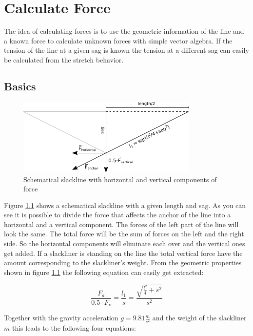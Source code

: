 \chapter{Calculate Force}

The idea of calculating forces is to use the geometric information of the line and a known force to calculate unknown forces with simple vector algebra. If the tension of the line at a given sag is known the tension at a different sag can easily be calculated from the stretch behavior.

\section{Basics} \label{sec:basics}

\begin{figure}[htb] \centering
	\includegraphics[width=0.8\textwidth]{images/slacklineWithForces.pdf}
	\caption{Schematical slackline with horizontal and vertical components of force}
	\label{fig:slacklineWithForces}
\end{figure}

Figure \ref{fig:slacklineWithForces} shows a schematical slackline with a given length and sag. As you can see it is possible to divide the force that affects the anchor of the line into a horizontal and a vertical component. The forces of the left part of the line will look the same. The total force will be the sum of forces on the left and the right side. So the horizontal components will eliminate each over and the vertical ones get added. If a slackliner is standing on the line the total vertical force have the amount corresponding to the slackliner's weight. From the geometric properties shown in figure \ref{fig:slacklineWithForces} the following equation can easily get extracted:


\begin{equation}
	\frac{F_a}{0.5\cdot F_v} = \frac{l_1}{s} = \frac{\sqrt{\frac{l^2}{4} + s^2}}{s^2}
\end{equation}

Together with the gravity acceleration $g = 9.81\frac{m}{s^2}$ and the weight of the slackliner $m$ this leads to the following four equations:

